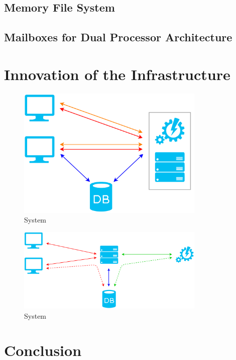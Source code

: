     \subsection{Memory File System}

    \subsection{Mailboxes for Dual Processor Architecture}

  \section{Innovation of the Infrastructure}

    \begin{figure}[h!]
      \centering
      \includegraphics[width=0.8\textwidth]{img/III-2-web-daq/new-sys.png}
      \caption{System}
      \label{fig:III-2-system-new}
    \end{figure}

    \begin{figure}[h!]
      \centering
      \includegraphics[width=0.8\textwidth]{img/III-2-web-daq/old-sys.png}
      \caption{System}
      \label{fig:III-2-system-old}
    \end{figure}

  \section{Conclusion}
